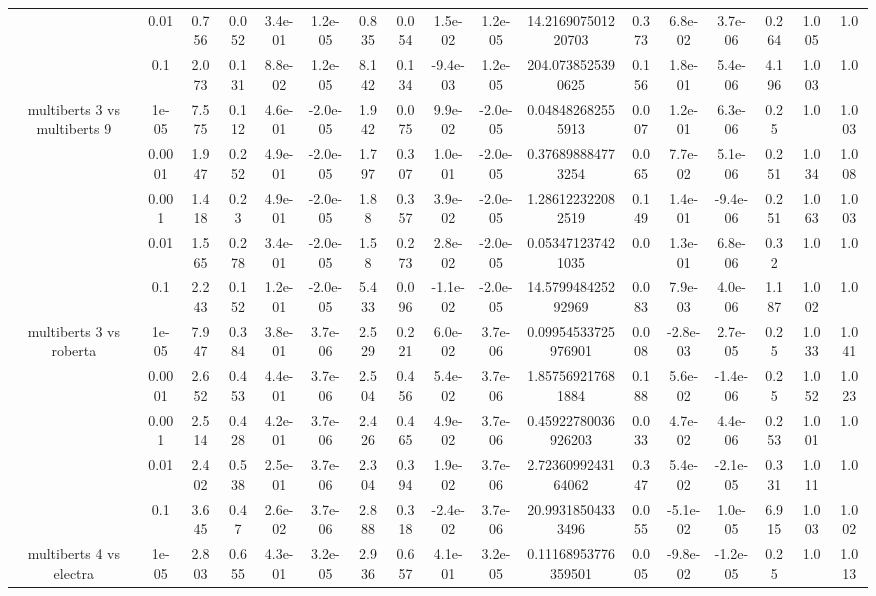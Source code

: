 \begin{tabular}{|c|c|c|c|c|c|c|c|c|c|c|c|c|c|c|c|c|}
 & 0.01 & 0.756 & 0.052 & 3.4e-01 & 1.2e-05 & 0.835 & 0.054 & 1.5e-02 & 1.2e-05 & 14.216907501220703 & 0.373 & 6.8e-02 & 3.7e-06 & 0.264 & 1.005 & 1.0 \\
 & 0.1 & 2.073 & 0.131 & 8.8e-02 & 1.2e-05 & 8.142 & 0.134 & -9.4e-03 & 1.2e-05 & 204.0738525390625 & 0.156 & 1.8e-01 & 5.4e-06 & 4.196 & 1.003 & 1.0 \\
\hline
\multirow{5}{*}{multiberts 3 vs multiberts 9} & 1e-05 & 7.575 & 0.112 & 4.6e-01 & -2.0e-05 & 1.942 & 0.075 & 9.9e-02 & -2.0e-05 & 0.048482682555913 & 0.007 & 1.2e-01 & 6.3e-06 & 0.25 & 1.0 & 1.003 \\
 & 0.0001 & 1.947 & 0.252 & 4.9e-01 & -2.0e-05 & 1.797 & 0.307 & 1.0e-01 & -2.0e-05 & 0.376898884773254 & 0.065 & 7.7e-02 & 5.1e-06 & 0.251 & 1.034 & 1.008 \\
 & 0.001 & 1.418 & 0.23 & 4.9e-01 & -2.0e-05 & 1.88 & 0.357 & 3.9e-02 & -2.0e-05 & 1.286122322082519 & 0.149 & 1.4e-01 & -9.4e-06 & 0.251 & 1.063 & 1.003 \\
 & 0.01 & 1.565 & 0.278 & 3.4e-01 & -2.0e-05 & 1.58 & 0.273 & 2.8e-02 & -2.0e-05 & 0.053471237421035 & 0.0 & 1.3e-01 & 6.8e-06 & 0.32 & 1.0 & 1.0 \\
 & 0.1 & 2.243 & 0.152 & 1.2e-01 & -2.0e-05 & 5.433 & 0.096 & -1.1e-02 & -2.0e-05 & 14.579948425292969 & 0.083 & 7.9e-03 & 4.0e-06 & 1.187 & 1.002 & 1.0 \\
\hline
\multirow{5}{*}{multiberts 3 vs roberta } & 1e-05 & 7.947 & 0.384 & 3.8e-01 & 3.7e-06 & 2.529 & 0.221 & 6.0e-02 & 3.7e-06 & 0.09954533725976901 & 0.008 & -2.8e-03 & 2.7e-05 & 0.25 & 1.033 & 1.041 \\
 & 0.0001 & 2.652 & 0.453 & 4.4e-01 & 3.7e-06 & 2.504 & 0.456 & 5.4e-02 & 3.7e-06 & 1.857569217681884 & 0.188 & 5.6e-02 & -1.4e-06 & 0.25 & 1.052 & 1.023 \\
 & 0.001 & 2.514 & 0.428 & 4.2e-01 & 3.7e-06 & 2.426 & 0.465 & 4.9e-02 & 3.7e-06 & 0.45922780036926203 & 0.033 & 4.7e-02 & 4.4e-06 & 0.253 & 1.001 & 1.0 \\
 & 0.01 & 2.402 & 0.538 & 2.5e-01 & 3.7e-06 & 2.304 & 0.394 & 1.9e-02 & 3.7e-06 & 2.7236099243164062 & 0.347 & 5.4e-02 & -2.1e-05 & 0.331 & 1.011 & 1.0 \\
 & 0.1 & 3.645 & 0.47 & 2.6e-02 & 3.7e-06 & 2.888 & 0.318 & -2.4e-02 & 3.7e-06 & 20.99318504333496 & 0.055 & -5.1e-02 & 1.0e-05 & 6.915 & 1.003 & 1.002 \\
\hline
\multirow{5}{*}{multiberts 4 vs electra } & 1e-05 & 2.803 & 0.655 & 4.3e-01 & 3.2e-05 & 2.936 & 0.657 & 4.1e-01 & 3.2e-05 & 0.11168953776359501 & 0.005 & -9.8e-02 & -1.2e-05 & 0.25 & 1.0 & 1.013 \\

\end{tabular}
